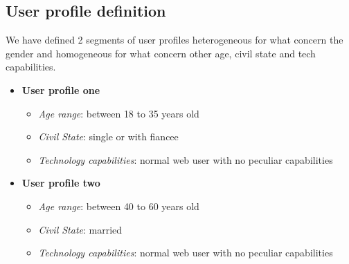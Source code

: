 \subsection{User profile definition}
We have defined 2 segments of user profiles heterogeneous for what concern the gender and homogeneous for what concern 	other age, civil state and tech capabilities.
\begin{itemize}
		\item \textbf{User profile one}
			\begin{itemize}
				\item \emph{Age range}: between 18 to 35 years old
				\item \emph{Civil State}: single or with fiancee
				\item \emph{Technology capabilities}: normal web user with no peculiar capabilities
			\end{itemize}
		\item \textbf{User profile two}
			\begin{itemize}
				\item \emph{Age range}: between 40 to 60 years old
				\item \emph{Civil State}: married
				\item \emph{Technology capabilities}: normal web user with no peculiar capabilities
			\end{itemize}
\end{itemize}


